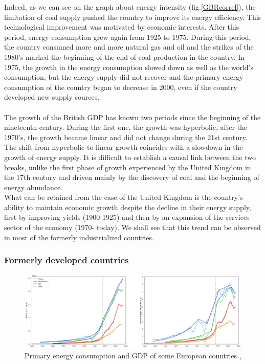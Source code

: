 \documentclass[conference]{IEEEtran}
\begin{document}
Indeed, as we can see on the graph about energy intensity (fig.\ref{GBRcorrel}), the limitation of coal supply pushed the country to improve its energy efficiency. This technological improvement was motivated by economic interests. After this period, energy consumption grew again from 1925 to 1975. During this period, the country consumed more and more natural gas and oil and the strikes of the 1980’s marked the beginning of the end of coal production in the country. 
In 1975, the growth in the energy consumption slowed down as well as the world’s consumption, but the energy supply did not recover and the primary energy consumption of the country began to decrease in 2000, even if the country developed new supply sources. 
\\ 
\\
The growth of the British GDP has known two periods since the beginning of the nineteenth century. During the first one, the growth was hyperbolic, after the 1970’s, the growth became linear and did not change during the 21st century. 
The shift from hyperbolic to linear growth coincides with a slowdown in the growth of energy supply. It is difficult to establish a causal link between the two breaks, unlike the first phase of growth experienced by the United Kingdom in the 17th century and driven mainly by the discovery of coal and the beginning of energy abundance.
\\
What can be retained from the case of the United Kingdom is the country's ability to maintain economic growth despite the decline in their energy supply, first by improving yields (1900-1925) and then by an expansion of the services sector  of the economy (1970- today).  
We shall see that this trend can be observed in most of the formerly industrialized countries.


\subsubsection{Formerly developed countries}

\begin{figure}
    \centering
    \includegraphics[scale=0.25]{europe.png}
    \caption{Primary energy consumption and GDP of some European countries \cite{harvard_university_national_2021}, \cite{bolt_maddison_2020}}
    \label{europe}
\end{figure}
\end{document}
